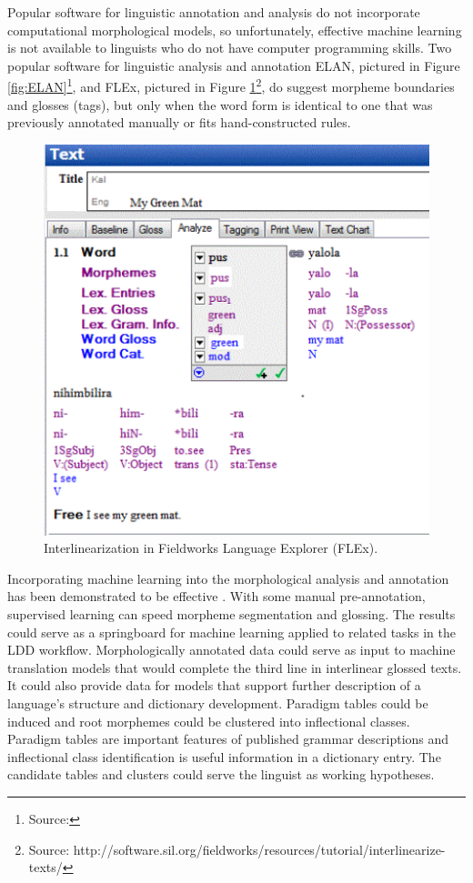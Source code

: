 \documentclass[12pt]{article}
\begin{document}
Popular software for linguistic annotation and analysis do not incorporate computational morphological models, so unfortunately, effective machine learning is not available to linguists who do not have computer programming skills. Two popular software for linguistic analysis and annotation ELAN, pictured in Figure \ref{fig:ELAN}\footnote{Source: }, and FLEx, pictured in Figure \ref{fig:FLEX}\footnote{Source: http://software.sil.org/fieldworks/resources/tutorial/interlinearize-texts/}, do suggest morpheme boundaries and glosses (tags), but only when the word form is identical to one that was previously annotated manually or fits hand-constructed rules. 
\begin{figure}[ht]
\label{fig:FLEX}
\begin{center}
\includegraphics[width=0.40\columnwidth]{FLExIGT.png}
\caption{Interlinearization in Fieldworks Language Explorer (FLEx).}
\end{center}
\end{figure}

Incorporating machine learning into the morphological analysis and annotation has been demonstrated to be effective \cite{baldridge_how_2009,palmer_semi-automated_2009,palmer_evaluating_2009}. With some manual pre-annotation, supervised learning can speed morpheme segmentation and glossing. The results could serve as a springboard for machine learning applied to related tasks in the LDD workflow. Morphologically annotated data could serve as input to machine translation models that would complete the third line in interlinear glossed texts. It could also provide data for models that support further description of a language's structure and dictionary development. Paradigm tables could be induced and root morphemes could be clustered into inflectional classes. Paradigm tables are important features of published grammar descriptions and inflectional class identification is useful information in a dictionary entry. The candidate tables and clusters could serve the linguist as working hypotheses.
\end{document}
